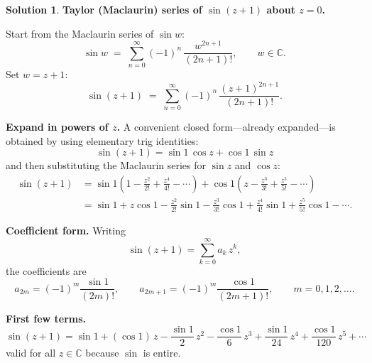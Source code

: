 \documentclass[12pt]{article}
\theoremstyle{definition} %
\newtheorem{solution}{Solution}
\theoremstyle{plain} %
\begin{document}
      \begin{solution}
        \textbf{Taylor (Maclaurin) series of $\sin(z+1)$ about $z=0$.}
        
        Start from the Maclaurin series of $\sin w$:
        \[
           \sin w \;=\;\sum_{n=0}^{\infty}
                        (-1)^{n}\,\frac{w^{2n+1}}{(2n+1)!},
           \qquad w\in\mathbb{C}.
        \]
        Set $w=z+1$:
        \[
           \sin(z+1)
           \;=\;
           \sum_{n=0}^{\infty}
               (-1)^{n}\,\frac{(z+1)^{2n+1}}{(2n+1)!}.
        \]
        
        \bigskip
        \textbf{Expand in powers of $z$.}  
        A convenient closed form—already expanded—is obtained by using
        elementary trig identities:
        \[
           \boxed{\;
             \sin(z+1)=\sin 1\,\cos z+\cos 1\,\sin z
           \;}
        \]
        and then substituting the Maclaurin series for $\sin z$ and $\cos z$:
        \[
        \begin{aligned}
        \sin(z+1)
        &=\sin 1\left(1-\frac{z^{2}}{2!}+\frac{z^{4}}{4!}-\cdots\right)
         +\cos 1\left(z-\frac{z^{3}}{3!}+\frac{z^{5}}{5!}-\cdots\right)\\[4pt]
        &=\sin 1
          +z\cos 1
          -\frac{z^{2}}{2!}\sin 1
          -\frac{z^{3}}{3!}\cos 1
          +\frac{z^{4}}{4!}\sin 1
          +\frac{z^{5}}{5!}\cos 1
          -\cdots.
        \end{aligned}
        \]
        
        \bigskip
        \textbf{Coefficient form.}
        Writing
        \[
           \sin(z+1)=\sum_{k=0}^{\infty}a_k\,z^{k},
        \]
        the coefficients are
        \[
           a_{2m}=(-1)^{m}\frac{\sin 1}{(2m)!},
           \qquad
           a_{2m+1}=(-1)^{m}\frac{\cos 1}{(2m+1)!},
           \qquad m=0,1,2,\dots.
        \]
        
        \bigskip
        \textbf{First few terms.}
        \[
           \boxed{\displaystyle
             \sin(z+1)=
               \sin 1
               +(\cos 1)\,z
               -\frac{\sin 1}{2}\,z^{2}
               -\frac{\cos 1}{6}\,z^{3}
               +\frac{\sin 1}{24}\,z^{4}
               +\frac{\cos 1}{120}\,z^{5}
               +\cdots
           } 
        \]
        valid for all $z\in\mathbb{C}$ because $\sin$ is entire.
        \end{solution}
\end{document}
